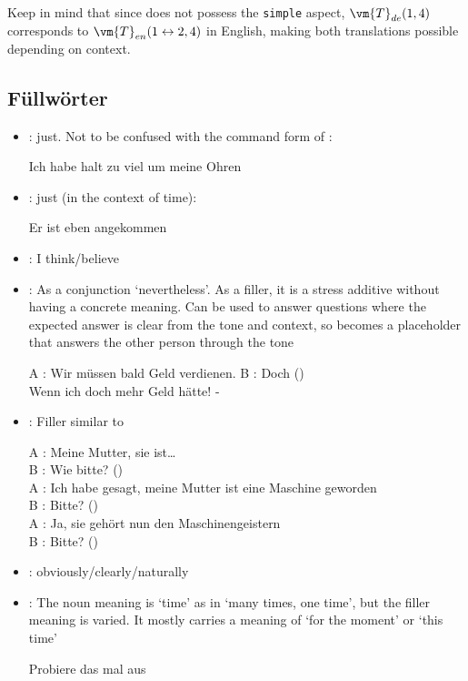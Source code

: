 \bt{*}Keep in mind that since  does not possess the \texttt{simple} aspect, $\vm{T}_{de}(1,4)$ corresponds to  $\vm{T}_{en}(1\leftrightarrow2,4)$ in English, making both translations possible depending on context.
\subsection[Fillers]{Füllwörter}
\begin{itemize}
    \item {}: just. Not to be confused with the command form of :\begin{example}
        Ich habe halt zu viel um meine Ohren \end{example}
    \item {}: just (in the context of time):\begin{example}
        Er ist eben angekommen \end{example}
    \item {}: I think/believe
    \item {}:  As a conjunction `nevertheless'. As a filler, it is a stress additive without having a concrete meaning. Can be used to answer questions where the expected answer is clear from the tone and context, so  becomes a placeholder that answers the other person through the tone\begin{example}
        A : Wir müssen bald Geld verdienen. B : Doch ()\\ Wenn ich doch mehr Geld hätte! - \end{example}
    \item {}: Filler similar to \begin{example}
        A : Meine Mutter, sie ist\ldots \\ B : Wie bitte? ()\\ A : Ich habe gesagt, meine Mutter ist eine Maschine geworden \\ B : Bitte? ()\\ A : Ja, sie gehört nun den Maschinengeistern\\ B : Bitte? () \end{example}
    \item {}: obviously/clearly/naturally
    \item {}: The noun meaning is `time' as in `many times, one time', but the filler meaning is varied. It mostly carries a meaning of `for the moment' or `this time' \begin{example} Probiere das mal aus \end{example}

\end{itemize}
